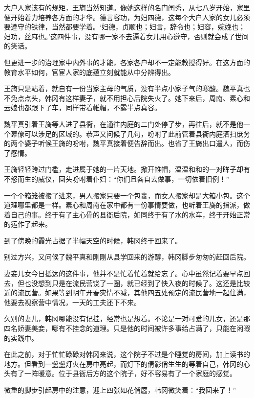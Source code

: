 大户人家该有的规矩，王旖当然知道。像她这样的名门闺秀，从七八岁开始，家里便开始着力培养各方面的才华。德言容功，为妇四德，这每个大户人家的女儿必须要遵守的铁律，当然都要学着。‘妇德，贞顺也；妇言，辞令也；妇容，婉娩也；妇功，丝麻也。’这四件事，没有哪一家不去逼着女儿用心遵守，否则就会成了世间的笑话。

但更进一步的治理家中内外事的才能，各家各户却不一定能教授得好。在这方面的教育水平如何，官宦人家的底蕴立刻就能从中分辨得出。

王旖只是站着，就自有一份当家主母的气质，没有半点小家子气的寒酸。魏平真也不免点点头，韩冈有这样妻子，就不用担心后院失火了。她下来后，周南、素心和云娘也都跟下了车，同样带着帷帽，不露半点真容。

魏平真引着王旖等人进了县衙，在通往内庭的二门处停了步，再往后，就不是他一个幕僚可以涉足的区域的。恭声又问候了几句，吩咐了此前管着县衙内庭洒扫庶务的两个婆子听候王旖的吩咐，魏平真接着便告辞而出。也省了王旖出口遣人，而伤了感情。

王旖轻轻跨过门槛，走进属于她的一片天地。掀开帷帽，温温和和的一对眸子却有不怒而生的威仪，回头吩咐着仆妇：“你们且各自去做事，一切依着旧例！”

一个个箱笼被搬了进来，男人搬家只要一个包裹，而女人搬家却是大箱小包。这个道理哪里都是一样。素心和周南在家中都有一份事情要做，也听着王旖的指派，做着自己的事。终于有了主心骨的县衙后院，如同终于有了水的水车，终于开始正常的运作了起来。

到了傍晚的霞光占据了半幅天空的时候，韩冈终于回来了。

别过方兴，又问候了魏平真和刚刚从县学回来的游醇，韩冈脚步匆匆的赶回后院。

妻妾儿女今日抵达的这件事，他并不是忙着忙着就给忘了。心中虽然记着要早点回去，但也没想到只是在流民营饶了一圈，就已经到了快入夜的时候了。这还是比较近的流民营。如果等到明年开春灾情不减，其他四五处预定的流民营地一起住满，他要去视察营中情况，一天的工夫还下不来。

久别的妻儿，韩冈哪能没有记挂，经常也是想着。不论是一对可爱的儿女，还是那四名娇妻美妾，哪有不挂念的道理。只是他的时间被许多事给占满了，只能在闲暇的实践中。

在此之前，对于忙忙碌碌对韩冈来说，这个院子不过是个睡觉的房间，加上读书的地方。但看到一盏盏灯火在房中亮起，而灯下的倩影俏生生的等着自己，韩冈的心头有了一阵暖意。位于县衙后方的这个院子，好不容易有了一个家庭的感觉。

微重的脚步引起房中的注意，迎上四张如花俏靥，韩冈微笑着：“我回来了！”

